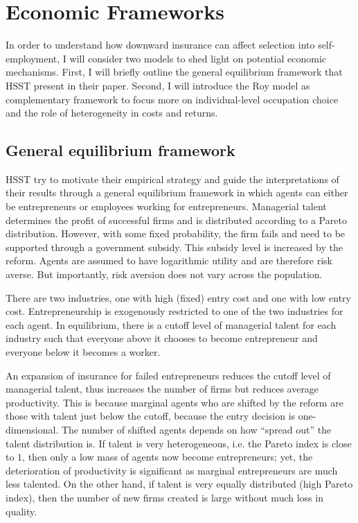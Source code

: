 \section{Economic Frameworks}

In order to understand how downward insurance can affect selection into self-employment, I will consider two models to shed light on potential economic mechanisms. First, I will briefly outline the general equilibrium framework that HSST present in their paper. Second, I will introduce the Roy model as complementary framework to focus more on individual-level occupation choice and the role of heterogeneity in costs and returns.

\subsection{General equilibrium framework}

HSST try to motivate their empirical strategy and guide the interpretations of their results through a general equilibrium framework in which agents can either be entrepreneurs or employees working for entrepreneurs. Managerial talent determines the profit of successful firms and is distributed according to a Pareto distribution. However, with some fixed probability, the firm fails and need to be supported through a government subsidy. This subsidy level is increased by the reform. Agents are assumed to have logarithmic utility and are therefore risk averse. But importantly, risk aversion does not vary across the population.

There are two industries, one with high (fixed) entry cost and one with low entry cost. Entrepreneurship is exogenously restricted to one of the two industries for each agent. In equilibrium, there is a cutoff level of managerial talent for each industry such that everyone above it chooses to become entrepreneur and everyone below it becomes a worker.

An expansion of insurance for failed entrepreneurs reduces the cutoff level of managerial talent, thus increases the number of firms but reduces average productivity. This is because marginal agents who are shifted by the reform are those with talent just below the cutoff, because the entry decision is one-dimensional. The number of shifted agents depends on how ``spread out'' the talent distribution is. If talent is very heterogeneous, i.e. the Pareto index is close to $1$, then only a low mass of agents now become entrepreneurs; yet, the deterioration of productivity is significant as marginal entrepreneurs are much less talented. On the other hand, if talent is very equally distributed (high Pareto index), then the number of new firms created is large without much loss in quality. 

